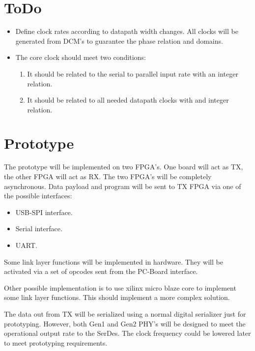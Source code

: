 \documentclass[11pt,a4paper]{article}
\begin{document}
\section{ToDo}
\begin{itemize}
	\item Define clock rates according to datapath width changes. All clocks will be generated from DCM's to guarantee the phase relation and domains.
	\item The core clock should meet two conditions:
	\begin{enumerate}
		\item It should be related to the serial to parallel input rate with an integer relation.
		\item It should be related to all needed datapath clocks with and integer relation.
	\end{enumerate}
\end{itemize}


\section{Prototype}
The prototype will be implemented on two FPGA's. One board will act as TX, the other FPGA will act as RX. The two FPGA's will be completely asynchronous.
Data payload and program will be sent to TX FPGA via one of the possible interfaces:
\begin{itemize}
	\item USB-SPI interface.
	\item Serial interface.
	\item UART.
\end{itemize}

Some link layer functions will be implemented in hardware. They will be activated via a set of opcodes sent from the PC-Board interface.

Other possible implementation is to use xilinx micro blaze core to implement some link layer functions. This should implement a more complex solution.

The data out from TX will be serialized using a normal digital serializer just for prototyping. However, both Gen1 and Gen2 PHY's will be designed to meet the operational output rate to the SerDes. The clock frequency could be lowered later to meet prototyping requirements.
\end{document}
